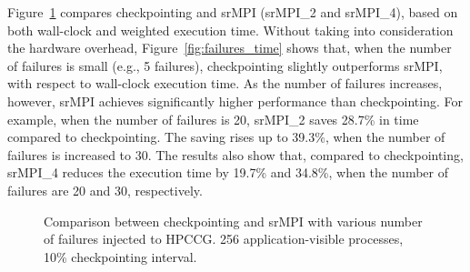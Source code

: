 Figure~\ref{fig:multiple_failure} compares checkpointing and srMPI (srMPI\_2 and srMPI\_4), based on both wall-clock and weighted execution time. Without taking into consideration the hardware overhead, Figure~\ref{fig:failures_time} shows that, when the number of failures is small (e.g., 5 failures), checkpointing slightly outperforms srMPI,  with respect to wall-clock execution time. As the number of failures increases, however, srMPI achieves significantly higher performance than checkpointing. For example, when the number of failures is 20, srMPI\_2 saves 28.7\% in time compared to checkpointing. The saving rises up to 39.3\%, when the number of failures is increased to $30$. The results also show that, compared to checkpointing, srMPI\_4 reduces the execution time by 19.7\% and 34.8\%, when the number of failures are 20 and 30, respectively. 

\begin{figure}[!t]
  \begin{center}
  \end{center}
  \caption{Comparison between checkpointing and srMPI with various number of failures injected to HPCCG. 256 application-visible processes, 10\% checkpointing interval.}

  \label{fig:multiple_failure}
\end{figure}



